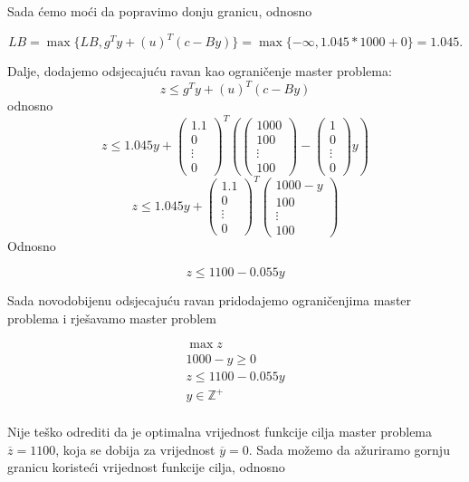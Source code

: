 \documentclass[a4paper, utf8, 11pt, colorlinks]{book}
\begin{document}
Sada ćemo moći da popravimo donju granicu, odnosno

$$LB = \max\{LB,g^Ty+(u)^T(c-By)\}=\max\{-\infty,1.045*1000+0\} = 1.045.$$

Dalje, dodajemo odsjecajuću ravan kao ograničenje master problema:
$$z\leqslant g^Ty+(u)^T(c-By)$$ 
odnosno
$$z\leqslant 1.045y+\left(\begin{array}{c}
	1.1 \\
	0 \\
	\vdots \\
	0
\end{array}\right)^T
\left(\left(\begin{array}{c}
	1000 \\
	100 \\
	\vdots \\
	100
\end{array}\right)-\left(\begin{array}{c}
1 \\
0 \\
\vdots \\
0
\end{array}\right)y\right)$$
$$z\leqslant 1.045y+\left(\begin{array}{c}
	1.1 \\
	0 \\
	\vdots \\
	0
\end{array}\right)^T
\left(\begin{array}{c}
	1000-y \\
	100 \\
	\vdots \\
	100
\end{array}\right)$$
Odnosno

$$z\leqslant 1100-0.055y$$

Sada novodobijenu odsjecajuću ravan pridodajemo ograničenjima master problema i rješavamo master problem

$$
\begin{aligned}
	\max z\\
	1000-y\geqslant 0\\
	z\leqslant 1100-0.055y\\ 
	y\in\mathbb{Z}^+\\	
\end{aligned}
$$

Nije teško odrediti da je optimalna vrijednost funkcije cilja master problema $\overline{z}=1100$, koja se dobija za vrijednost $\overline{y}=0$.
Sada možemo da ažuriramo gornju granicu koristeći vrijednost funkcije cilja, odnosno
\end{document}
